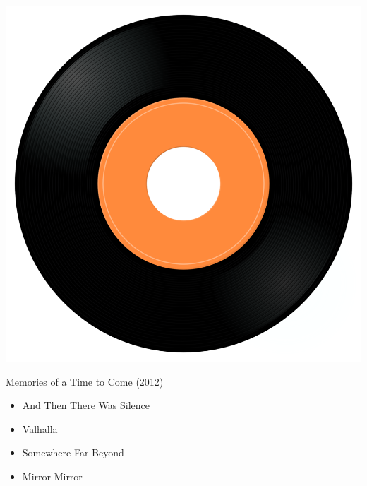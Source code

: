 \begin{minipage}[t]{0.25\textwidth}
\captionsetup{type=figure}
\includegraphics[width=\textwidth]{Images/cover.png}
\caption*{Memories of a Time to Come (2012)}
\end{minipage}
\begin{minipage}[t]{0.25\textwidth}\vspace{0pt}
\begin{itemize}[nosep,leftmargin=1em,labelwidth=*,align=left]
	\setlength{\itemsep}{0pt}
	\item And Then There Was Silence
	\item Valhalla
	\item Somewhere Far Beyond
	\item Mirror Mirror
\end{itemize}
\end{minipage}
